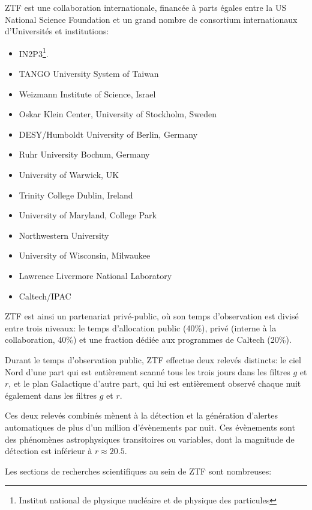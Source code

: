 \documentclass[../main/main.tex]{subfiles}
\begin{document}
ZTF est une collaboration internationale, financée à parts égales entre
la US National Science Foundation et un grand nombre de consortium
internationaux d'Universités et institutions:

\begin{multicols}{2}
\begin{itemize}[noitemsep, label=$\bullet$]
    \item IN2P3\footnote{Institut national de physique nucléaire et de physique
    des particules}.
    \item TANGO University System of Taiwan
    \item Weizmann Institute of Science, Israel
    \item Oskar Klein Center, University of Stockholm, Sweden
    \item DESY/Humboldt University of Berlin, Germany
    \item Ruhr University Bochum, Germany
    \item University of Warwick, UK
    \item Trinity College Dublin, Ireland
    \item University of Maryland, College Park
    \item Northwestern University
    \item University of Wisconsin, Milwaukee
    \item Lawrence Livermore National Laboratory
    \item Caltech/IPAC
\end{itemize}
\end{multicols}

ZTF est ainsi un partenariat privé-public, où son temps d'observation
est divisé entre trois niveaux: le temps d'allocation public (40\%), privé
(interne à la collaboration, 40\%) et une fraction dédiée aux programmes de Caltech (20\%).

Durant le temps d'observation public, ZTF effectue deux relevés distincts: le ciel
Nord d'une part qui est entièrement scanné tous les trois jours dans les
filtres $g$ et $r$, et le plan
Galactique d'autre part, qui lui est entièrement observé chaque nuit
également dans les filtres $g$ et $r$.

Ces deux relevés combinés mènent à la détection et la génération
d'alertes automatiques de plus d'un million d'évènements par nuit. Ces
évènements sont des phénomènes astrophysiques transitoires ou variables,
dont la magnitude de détection est inférieur à $r\approx 20.5$. 

Les sections de recherches scientifiques au sein de ZTF sont nombreuses:
\end{document}
